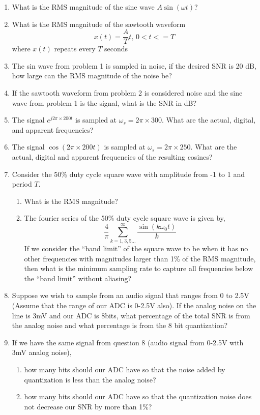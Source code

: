 \begin{enumerate}

\item What is the RMS magnitude of the sine wave $A\sin(\omega t)$?
\item What is the RMS magnitude of the sawtooth waveform 
\begin{equation*}
			x(t) = \frac{A}{T} t\text{,        } 0<t<=T
\end{equation*}
			where $x(t)$ repeats every $T$ seconds
\item The sin wave from problem 1 is sampled in noise, 
			if the desired SNR is 20 dB, how large can the RMS magnitude of the noise be?
\item If the sawtooth waveform from problem 2 is considered noise and
			the sine wave from problem 1 is the signal, what is the SNR in dB?
\item The signal $e^{j 2\pi \times200 t}$ is sampled at $\omega_s=2\pi\times300$. 
			What are the actual, digital, and apparent frequencies?
\item The signal $\cos( 2\pi \times200 t)$ is sampled at $\omega_s=2\pi\times250$.
			What are the actual, digital and apparent frequencies of the resulting cosines?
\item Consider the 50\% duty cycle square wave with amplitude from -1 to 1 and period $T$.
\begin{enumerate}
\item What is the RMS magnitude?
\item The fourier series of the 50\% duty cycle square wave is given by,
\begin{equation*}
\frac{4}{\pi} \sum_{k=1,3,5...}^\infty \frac{\sin(k \omega_0 t)}{k}
\end{equation*}			
If we consider the ``band limit'' of the square wave to be when it has no other frequencies with magnitudes larger than 1\% of the RMS magnitude, then what is the minimum sampling rate to capture all frequencies below the ``band limit'' without aliasing?
	\end{enumerate}
\item Suppose we wish to sample from an audio signal that ranges from 0 to 2.5V (Assume that the range of our ADC is 0-2.5V also). If the analog noise on the line is 3mV and our ADC is 8bits, what percentage of the total SNR is from the analog noise and what percentage is from the 8 bit quantization?
\item If we have the same signal from question 8 (audio signal from 0-2.5V with 3mV analog noise), 
	\begin{enumerate}
			\item how many bits should our ADC have so that the noise added by quantization is less than the analog noise?
			\item how many bits should our ADC have so that the quantization noise does not decrease our SNR by more than 1\%?
	\end{enumerate}


\end{enumerate}
